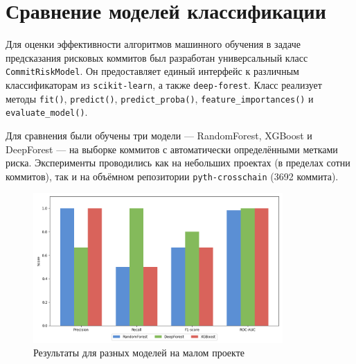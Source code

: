\section{Сравнение моделей классификации}

Для оценки эффективности алгоритмов машинного обучения в задаче предсказания рисковых коммитов был разработан универсальный класс \texttt{CommitRiskModel}. Он предоставляет единый интерфейс к различным классификаторам из \texttt{scikit-learn}, а также \texttt{deep-forest}. Класс реализует методы \texttt{fit()}, \texttt{predict()}, \texttt{predict\_proba()}, \texttt{feature\_importances()} и \texttt{evaluate\_model()}.

Для сравнения были обучены три модели — RandomForest, XGBoost и DeepForest — на выборке коммитов с автоматически определёнными метками риска. Эксперименты проводились как на небольших проектах (в пределах сотни коммитов), так и на объёмном репозитории \texttt{pyth-crosschain} (3692 коммита).


\begin{table}[h!]
	\centering
	\caption{Сравнение моделей классификации на малом и большом репозитории}
	\label{tab:metrics_comparison_combined}
\end{table}

\begin{figure}[ht]
	\centering
	\includegraphics[width=0.85\textwidth]{my_folder/images/low_model_comparison.png}
	\caption{Результаты для разных моделей на малом проекте}
	\label{tab:model_comparison1}
\end{figure}

